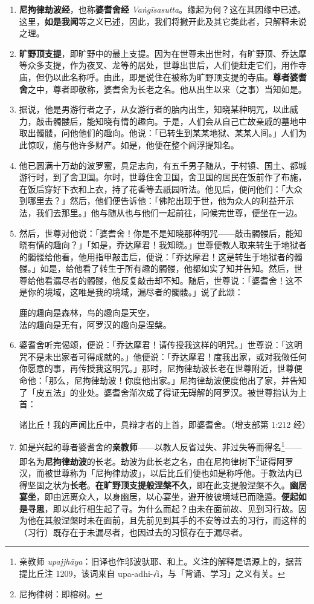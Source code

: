 \begin{enumerate}\item \textbf{尼拘律劫波经}，也称\textbf{婆耆舍经} \textit{Vaṅgīsasutta}。缘起为何？这在其因缘中已述。这里，\textbf{如是我闻}等之义已述，因此，我们将撇开此及其它类此者，只解释未说之理。
\item \textbf{旷野顶支提}，即旷野中的最上支提。因为在世尊未出世时，有旷野顶、乔达摩等众多支提，作为夜叉、龙等的居处，世尊出世后，人们便赶走它们，用作寺庙，但仍以此名称呼。由此，即是说住在被称为旷野顶支提的寺庙。\textbf{尊者婆耆舍}之中，尊者即敬称，婆耆舍为长老之名。他从出生以来（之事）当知如是。
\item 据说，他是男游行者之子，从女游行者的胎内出生，知晓某种明咒，以此威力，敲击髑髅后，能知晓有情的趣向。于是，人们会从自己亡故亲戚的墓地中取出髑髅，问他他们的趣向。他说：「已转生到某某地狱、某某人间。」人们为此惊叹，施与他许多财产。如是，他便在整个阎浮提知名。
\item 他已圆满十万劫的波罗蜜，具足志向，有五千男子随从，于村镇、国土、都城游行时，到了舍卫国。尔时，世尊住舍卫国，舍卫国的居民在饭前作了布施，在饭后穿好下衣和上衣，持了花香等去祇园听法。他见后，便问他们：「大众到哪里去？」然后，他们便告诉他：「佛陀出现于世，他为众人的利益开示法，我们去那里。」他与随从也与他们一起前往，问候完世尊，便坐在一边。
\item 然后，世尊对他说：「婆耆舍！你是不是知晓那种明咒——敲击髑髅后，能知晓有情的趣向？」「如是，乔达摩君！我知晓。」世尊便教人取来转生于地狱者的髑髅给他看，他用指甲敲击后，便说：「乔达摩君！这是转生于地狱者的髑髅。」如是，给他看了转生于所有趣的髑髅，他都如实了知并告知。然后，世尊给他看漏尽者的髑髅，他反复敲击却不知。随后，世尊说：「婆耆舍！这不是你的境域，这唯是我的境域，漏尽者的髑髅。」说了此颂：\begin{quoting}鹿的趣向是森林，鸟的趣向是天空，\\法的趣向是无有，阿罗汉的趣向是涅槃。\end{quoting}
\item 婆耆舍听完偈颂，便说：「乔达摩君！请传授我这样的明咒。」世尊说：「这明咒不是未出家者可得成就的。」他便说：「乔达摩君！度我出家，或对我做任何你愿意的事，再传授我这明咒。」那时，尼拘律劫波长老在世尊附近，世尊便命他：「那么，尼拘律劫波！你度他出家。」尼拘律劫波便度他出了家，并告知了「皮五法」的业处。婆耆舍渐次成了得证无碍解的阿罗汉。被世尊指认为上首：\begin{quoting}诸比丘！我的声闻比丘中，具辩才者的上首，即婆耆舍。（增支部第 1:212 经）\end{quoting}
\item 如是兴起的尊者婆耆舍的\textbf{亲教师}——以教人反省过失、非过失等而得名\footnote{亲教师 \textit{upajjhāya}：旧译也作邬波驮耶、和上。义注的解释是语源上的，据菩提比丘注 1209，该词来自 upa-adhi-√i，与「背诵、学习」之义有关。}——即名为\textbf{尼拘律劫波}的长老。劫波为此长老之名，由在尼拘律树下\footnote{尼拘律树：即榕树。}证得阿罗汉，而被世尊称为「尼拘律劫波」，以后比丘们便也如是称呼他。于教法内已得坚固之状为\textbf{长老}。\textbf{在旷野顶支提般涅槃不久}，即在此支提般涅槃不久。\textbf{幽居宴坐}，即由远离众人，以身幽居，以心宴坐，避开彼彼境域已而隐遁。\textbf{便起如是寻思}，即以此行相生起了寻。为什么而起？由未在面前故、见到习行故。因为他在其般涅槃时未在面前，且先前见到其手的不安等过去的习行，而这样的（习行）既存在于未漏尽者，也因过去的习惯存在于漏尽者。

\end{enumerate}

